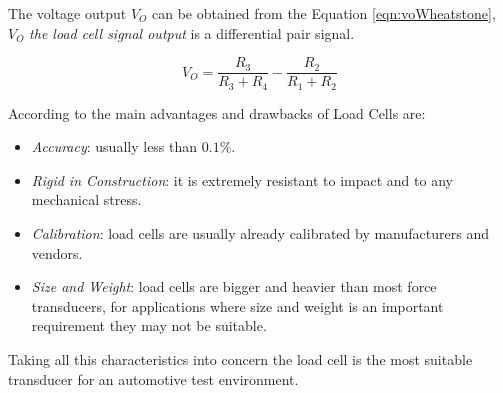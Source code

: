 	The voltage output $V_{O}$ can be obtained from the Equation \ref{eqn:voWheatstone}, $V_{O}$ \textit{the load cell signal output} is a differential pair signal.

	\begin{equation}\label{eqn:voWheatstone}
		V_{O}=\frac{ R_{3} }{ R_{3} + R_{4} } - \frac{ R_{2} }{ R_{1} + R_{2}}
	\end{equation}

	According to \cite{dillon1989load} the main advantages and drawbacks of Load Cells are: 

	\begin{itemize}
		\item \textit{Accuracy}: usually less than $0.1\%$.\label{itm:accuracy-load-cell}
		\item \textit{Rigid in Construction}: it is extremely resistant to impact and to any mechanical stress.\label{itm:rigid-load-cell}
		\item \textit{Calibration}: load cells are usually already calibrated by manufacturers and vendors.\label{itm:calibration-load-cell}
		\item \textit{Size and Weight}: load cells are bigger and heavier than most force transducers, for applications where size and weight is an important requirement they may not be suitable.\label{itm:size-and-weight}
	\end{itemize}

	Taking all this characteristics into concern the load cell is the most suitable transducer for an automotive test environment.